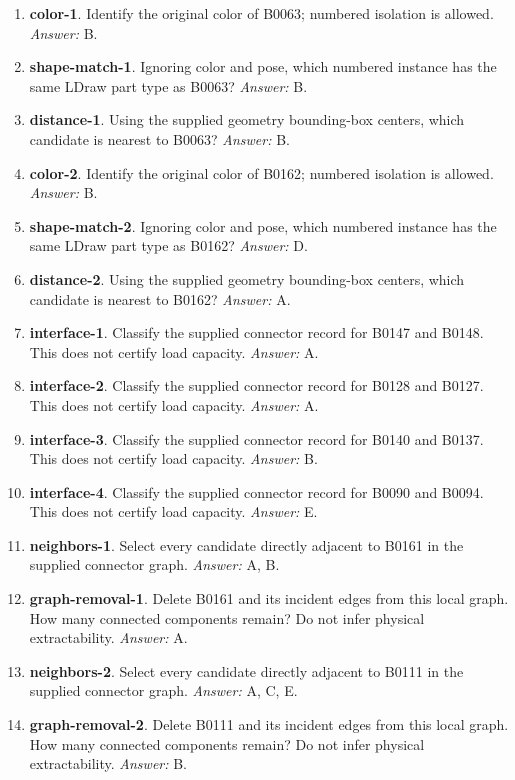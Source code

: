 \begin{enumerate}
\item \textbf{color-1}. Identify the original color of B0063; numbered isolation is allowed. \textit{Answer:} B.
\item \textbf{shape-match-1}. Ignoring color and pose, which numbered instance has the same LDraw part type as B0063? \textit{Answer:} B.
\item \textbf{distance-1}. Using the supplied geometry bounding-box centers, which candidate is nearest to B0063? \textit{Answer:} B.
\item \textbf{color-2}. Identify the original color of B0162; numbered isolation is allowed. \textit{Answer:} B.
\item \textbf{shape-match-2}. Ignoring color and pose, which numbered instance has the same LDraw part type as B0162? \textit{Answer:} D.
\item \textbf{distance-2}. Using the supplied geometry bounding-box centers, which candidate is nearest to B0162? \textit{Answer:} A.
\item \textbf{interface-1}. Classify the supplied connector record for B0147 and B0148. This does not certify load capacity. \textit{Answer:} A.
\item \textbf{interface-2}. Classify the supplied connector record for B0128 and B0127. This does not certify load capacity. \textit{Answer:} A.
\item \textbf{interface-3}. Classify the supplied connector record for B0140 and B0137. This does not certify load capacity. \textit{Answer:} B.
\item \textbf{interface-4}. Classify the supplied connector record for B0090 and B0094. This does not certify load capacity. \textit{Answer:} E.
\item \textbf{neighbors-1}. Select every candidate directly adjacent to B0161 in the supplied connector graph. \textit{Answer:} A, B.
\item \textbf{graph-removal-1}. Delete B0161 and its incident edges from this local graph. How many connected components remain? Do not infer physical extractability. \textit{Answer:} A.
\item \textbf{neighbors-2}. Select every candidate directly adjacent to B0111 in the supplied connector graph. \textit{Answer:} A, C, E.
\item \textbf{graph-removal-2}. Delete B0111 and its incident edges from this local graph. How many connected components remain? Do not infer physical extractability. \textit{Answer:} B.

\end{enumerate}
